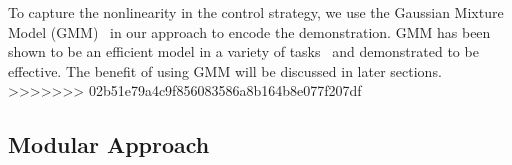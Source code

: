 To capture the nonlinearity in the control strategy, we use the Gaussian Mixture Model (GMM)~\cite{cohn1996active} in our approach to encode the demonstration. GMM has been shown to be an efficient model in a variety of tasks~\cite{huang2013learning,sauser2011iterative,calinon2007incremental} and demonstrated to be effective. The benefit of using GMM will be discussed in later sections.
>>>>>>> 02b51e79a4c9f856083586a8b164b8e077f207df

\subsection{Modular Approach}


